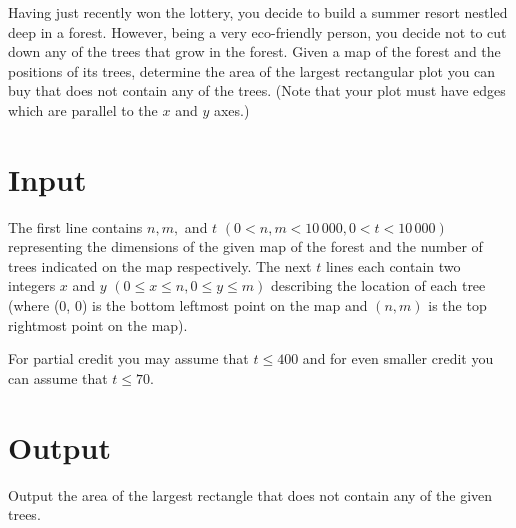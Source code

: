 Having just recently won the lottery, you decide to build a summer resort nestled deep in a forest.
However, being a very eco-friendly person, you decide not to cut down any of the trees that grow in
the forest. Given a map of the forest and the positions of its trees, determine the area of the
largest rectangular plot you can buy that does not contain any of the trees. (Note that your plot
must have edges which are parallel to the $x$ and $y$ axes.)

\section*{Input}
The first line contains $n, m,$ and $t$ $(0 < n, m < 10\,000, 0 < t < 10\,000)$ representing the
dimensions of the given map of the forest and the number of trees indicated on the map respectively.
The next $t$ lines each contain two integers $x$ and $y$ $(0 \le x \le n, 0 \le y \le m)$ describing the
location of each tree (where (0, 0) is the bottom leftmost point on the map and $(n, m)$ is the top
rightmost point on the map).

For partial credit you may assume that $t \le 400$ and for even smaller credit you can assume that
$t \le 70$.

\section*{Output}
Output the area of the largest rectangle that does not contain any of the given trees.
